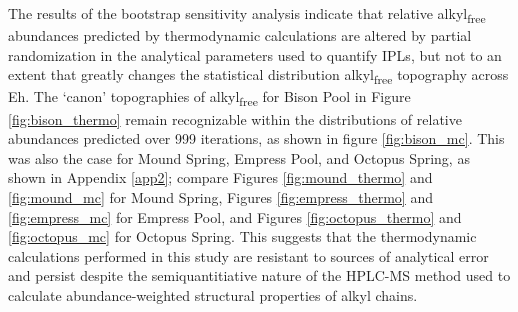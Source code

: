 The results of the bootstrap sensitivity analysis indicate that relative alkyl\textsubscript{free} abundances predicted by thermodynamic calculations are altered by partial randomization in the analytical parameters used to quantify IPLs, but not to an extent that greatly changes the statistical distribution alkyl\textsubscript{free} topography across Eh. The `canon' topographies of alkyl\textsubscript{free} for Bison Pool in Figure \ref{fig:bison_thermo} remain recognizable within the distributions of relative abundances predicted over 999 iterations, as shown in figure \ref{fig:bison_mc}. This was also the case for Mound Spring, Empress Pool, and Octopus Spring, as shown in Appendix \ref{app2}; compare Figures \ref{fig:mound_thermo} and \ref{fig:mound_mc} for Mound Spring, Figures \ref{fig:empress_thermo} and \ref{fig:empress_mc} for Empress Pool, and Figures \ref{fig:octopus_thermo} and \ref{fig:octopus_mc} for Octopus Spring. This suggests that the thermodynamic calculations performed in this study are resistant to sources of analytical error and persist despite the semiquantitiative nature of the HPLC-MS method used to calculate abundance-weighted structural properties of alkyl chains.


